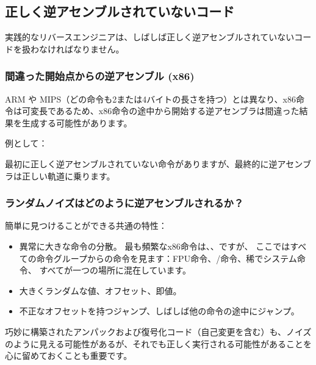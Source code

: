 \subsection{正しく逆アセンブルされていないコード}
\label{sec:incorrectly_disasmed_code}

実践的なリバースエンジニアは、しばしば正しく逆アセンブルされていないコードを扱わなければなりません。

\subsubsection{間違った開始点からの逆アセンブル (x86)}

ARM や MIPS（どの命令も2または4バイトの長さを持つ）とは異なり、x86命令は可変長であるため、x86命令の途中から開始する逆アセンブラは間違った結果を生成する可能性があります。

例として：



最初に正しく逆アセンブルされていない命令がありますが、最終的に逆アセンブラは正しい軌道に乗ります。

\subsubsection{ランダムノイズはどのように逆アセンブルされるか？}

簡単に見つけることができる共通の特性：

\begin{itemize}
\item 異常に大きな命令の分散。
最も頻繁なx86命令は\PUSH{}、\MOV{}、\CALL{}ですが、
ここではすべての命令グループからの命令を見ます：\ac{FPU}命令、/命令、稀でシステム命令、
すべてが一つの場所に混在しています。

\item 大きくランダムな値、オフセット、即値。

\item 不正なオフセットを持つジャンプ、しばしば他の命令の途中にジャンプ。
\end{itemize}











巧妙に構築されたアンパックおよび復号化コード（自己変更を含む）も、ノイズのように見える可能性があるが、それでも正しく実行される可能性があることを心に留めておくことも重要です。
